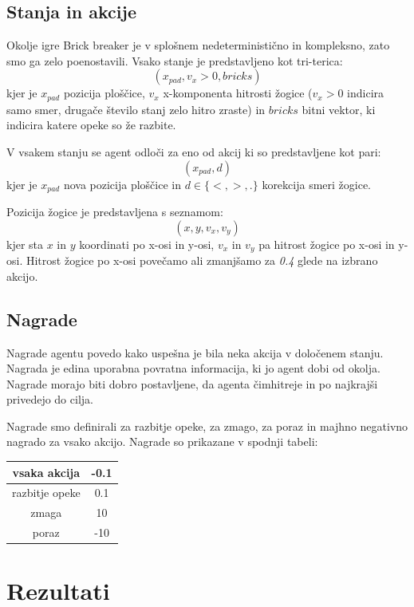 \documentclass[a4paper]{article}
\begin{document}
\subsection{Stanja in akcije}
Okolje igre Brick breaker je v splošnem nedeterministično in kompleksno, zato smo ga zelo poenostavili. Vsako stanje je predstavljeno kot tri-terica:
\[
	(x_{pad}, v_x > 0, bricks)
\]
kjer je $x_{pad}$ pozicija ploščice, $v_x$ x-komponenta hitrosti žogice ($v_x>0$ indicira samo smer, drugače število stanj zelo hitro zraste) in $bricks$ bitni vektor, ki indicira katere opeke so že razbite.

V vsakem stanju se agent odloči za eno od akcij ki so predstavljene kot pari:
\[
(x_{pad}, d)
\]
kjer je $x_{pad}$ nova pozicija ploščice in $d \in \{<, >, .\}$ korekcija smeri žogice. 

Pozicija žogice je predstavljena s seznamom:
\[
(x, y, v_x, v_y)
\]
kjer sta $x$ in $y$ koordinati po x-osi in y-osi, $v_x$ in $v_y$ pa hitrost žogice po x-osi in y-osi. Hitrost žogice po x-osi povečamo ali zmanjšamo za \emph{0.4} glede na izbrano akcijo.

\subsection{Nagrade}

Nagrade agentu povedo kako uspešna je bila neka akcija v določenem stanju. Nagrada je edina uporabna povratna informacija, ki jo agent dobi od okolja. Nagrade morajo biti dobro postavljene, da agenta čimhitreje in po najkrajši privedejo do cilja. 

Nagrade smo definirali za razbitje opeke, za zmago, za poraz in majhno negativno nagrado za vsako akcijo. Nagrade so prikazane v spodnji tabeli:

\begin{center}
\begin{tabular}{|c|c|}
	\hline
	vsaka akcija & -0.1 \\\hline
	razbitje opeke & 0.1 \\\hline
	zmaga & 10 \\\hline
	poraz & -10 \\
	\hline
\end{tabular}
\end{center}


\section{Rezultati}
\end{document}

